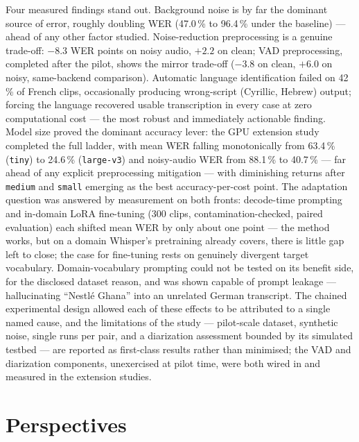 \documentclass[12pt]{report}
\begin{document}
Four measured findings stand out. Background noise is by far the dominant source of error, roughly doubling WER (47.0\,\% to 96.4\,\% under the baseline) --- ahead of any other factor studied. Noise-reduction preprocessing is a genuine trade-off: $-8.3$ WER points on noisy audio, $+2.2$ on clean; VAD preprocessing, completed after the pilot, shows the mirror trade-off ($-3.8$ on clean, $+6.0$ on noisy, same-backend comparison). Automatic language identification failed on 42\,\% of French clips, occasionally producing wrong-script (Cyrillic, Hebrew) output; forcing the language recovered usable transcription in every case at zero computational cost --- the most robust and immediately actionable finding. Model size proved the dominant accuracy lever: the GPU extension study completed the full ladder, with mean WER falling monotonically from 63.4\,\% (\texttt{tiny}) to 24.6\,\% (\texttt{large-v3}) and noisy-audio WER from 88.1\,\% to 40.7\,\% --- far ahead of any explicit preprocessing mitigation --- with diminishing returns after \texttt{medium} and \texttt{small} emerging as the best accuracy-per-cost point. The adaptation question was answered by measurement on both fronts: decode-time prompting and in-domain LoRA fine-tuning (300 clips, contamination-checked, paired evaluation) each shifted mean WER by only about one point --- the method works, but on a domain Whisper's pretraining already covers, there is little gap left to close; the case for fine-tuning rests on genuinely divergent target vocabulary. Domain-vocabulary prompting could not be tested on its benefit side, for the disclosed dataset reason, and was shown capable of prompt leakage --- hallucinating \enquote{Nestl\'e Ghana} into an unrelated German transcript. The chained experimental design allowed each of these effects to be attributed to a single named cause, and the limitations of the study --- pilot-scale dataset, synthetic noise, single runs per pair, and a diarization assessment bounded by its simulated testbed --- are reported as first-class results rather than minimised; the VAD and diarization components, unexercised at pilot time, were both wired in and measured in the extension studies.

\section*{Perspectives}
\end{document}
